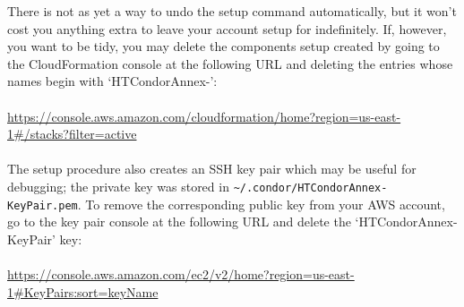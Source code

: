 There is not as yet a way to undo the setup command automatically, but it
won't cost you anything extra to leave your account setup for 
indefinitely.  If, however, you want to be tidy, you may delete the components
setup created by going to the CloudFormation console at the following URL
and deleting the entries whose names begin with `HTCondorAnnex-':\\
\\
\url{https://console.aws.amazon.com/cloudformation/home?region=us-east-1#/stacks?filter=active}\\
\\
The setup procedure also creates an SSH key pair which may be useful
for debugging; the private key was stored in
\texttt{\textasciitilde{}/.condor/HTCondorAnnex-KeyPair.pem}.  To remove the
corresponding public key from your AWS account, go to the key pair console
at the following URL and delete the `HTCondorAnnex-KeyPair' key:\\
\\
\url{https://console.aws.amazon.com/ec2/v2/home?region=us-east-1#KeyPairs:sort=keyName}
